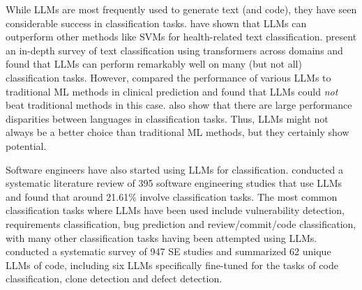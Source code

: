 \documentclass[a4paper]{article}
\begin{document}
While LLMs are most frequently used to generate text (and code), they have seen considerable success in classification tasks. \textcite{Guo2024health} have shown that LLMs can outperform other methods like SVMs for health-related text classification. \textcite{fields2024} present an in-depth survey of text classification using transformers across domains and found that LLMs can perform remarkably well on many (but not all) classification tasks. However, \textcite{Chen2024} compared the performance of various LLMs to traditional ML methods in clinical prediction and found that LLMs could \textit{not} beat traditional methods in this case. \textcite{vajjala2025} also show that there are large performance disparities between languages in classification tasks. Thus, LLMs might not always be a better choice than traditional ML methods, but they certainly show potential. 

Software engineers have also started using LLMs for classification. \textcite{hou2024} conducted a systematic literature review of 395 software engineering studies that use LLMs and found that around 21.61\% involve classification tasks. The most common classification tasks where LLMs have been used include vulnerability detection, requirements classification, bug prediction and review/commit/code classification, with many other classification tasks having been attempted using LLMs. \textcite{zhang2024} conducted a systematic survey of 947 SE studies and summarized 62 unique LLMs of code, including six LLMs specifically fine-tuned for the tasks of code classification, clone detection and defect detection.
\end{document}
